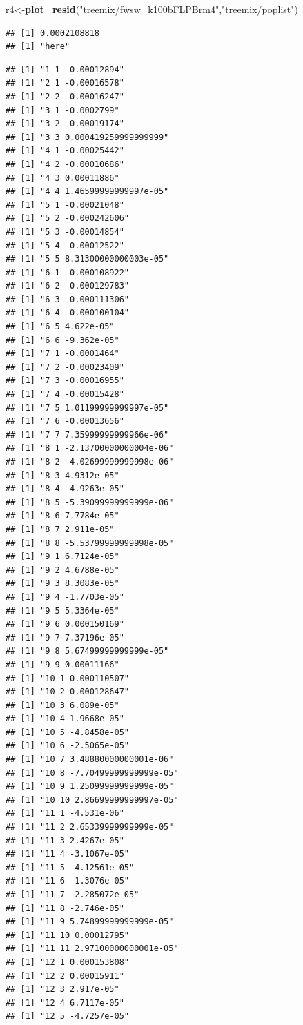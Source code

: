 \documentclass[]{article}
\newenvironment{Shaded}{\begin{snugshade}}{\end{snugshade}}
\newcommand{\KeywordTok}[1]{\textcolor[rgb]{0.13,0.29,0.53}{\textbf{#1}}}
\newcommand{\StringTok}[1]{\textcolor[rgb]{0.31,0.60,0.02}{#1}}
\newcommand{\NormalTok}[1]{#1}
\begin{document}
\begin{Shaded}
\begin{Highlighting}[]
\NormalTok{r4<-}\KeywordTok{plot_resid}\NormalTok{(}\StringTok{"treemix/fwsw_k100bFLPBrm4"}\NormalTok{,}\StringTok{"treemix/poplist"}\NormalTok{)}
\end{Highlighting}
\end{Shaded}

\begin{verbatim}
## [1] 0.0002108818
## [1] "here"
\end{verbatim}

\begin{verbatim}
## [1] "1 1 -0.00012894"
## [1] "2 1 -0.00016578"
## [1] "2 2 -0.00016247"
## [1] "3 1 -0.0002799"
## [1] "3 2 -0.00019174"
## [1] "3 3 0.000419259999999999"
## [1] "4 1 -0.00025442"
## [1] "4 2 -0.00010686"
## [1] "4 3 0.00011886"
## [1] "4 4 1.46599999999997e-05"
## [1] "5 1 -0.00021048"
## [1] "5 2 -0.000242606"
## [1] "5 3 -0.00014854"
## [1] "5 4 -0.00012522"
## [1] "5 5 8.31300000000003e-05"
## [1] "6 1 -0.000108922"
## [1] "6 2 -0.000129783"
## [1] "6 3 -0.000111306"
## [1] "6 4 -0.000100104"
## [1] "6 5 4.622e-05"
## [1] "6 6 -9.362e-05"
## [1] "7 1 -0.0001464"
## [1] "7 2 -0.00023409"
## [1] "7 3 -0.00016955"
## [1] "7 4 -0.00015428"
## [1] "7 5 1.01199999999997e-05"
## [1] "7 6 -0.00013656"
## [1] "7 7 7.35999999999966e-06"
## [1] "8 1 -2.13700000000004e-06"
## [1] "8 2 -4.02699999999998e-06"
## [1] "8 3 4.9312e-05"
## [1] "8 4 -4.9263e-05"
## [1] "8 5 -5.39099999999999e-06"
## [1] "8 6 7.7784e-05"
## [1] "8 7 2.911e-05"
## [1] "8 8 -5.53799999999998e-05"
## [1] "9 1 6.7124e-05"
## [1] "9 2 4.6788e-05"
## [1] "9 3 8.3083e-05"
## [1] "9 4 -1.7703e-05"
## [1] "9 5 5.3364e-05"
## [1] "9 6 0.000150169"
## [1] "9 7 7.37196e-05"
## [1] "9 8 5.67499999999999e-05"
## [1] "9 9 0.00011166"
## [1] "10 1 0.000110507"
## [1] "10 2 0.000128647"
## [1] "10 3 6.089e-05"
## [1] "10 4 1.9668e-05"
## [1] "10 5 -4.8458e-05"
## [1] "10 6 -2.5065e-05"
## [1] "10 7 3.48880000000001e-06"
## [1] "10 8 -7.70499999999999e-05"
## [1] "10 9 1.25099999999999e-05"
## [1] "10 10 2.86699999999997e-05"
## [1] "11 1 -4.531e-06"
## [1] "11 2 2.65339999999999e-05"
## [1] "11 3 2.4267e-05"
## [1] "11 4 -3.1067e-05"
## [1] "11 5 -4.12561e-05"
## [1] "11 6 -1.3076e-05"
## [1] "11 7 -2.285072e-05"
## [1] "11 8 -2.746e-05"
## [1] "11 9 5.74899999999999e-05"
## [1] "11 10 0.00012795"
## [1] "11 11 2.97100000000001e-05"
## [1] "12 1 0.000153808"
## [1] "12 2 0.00015911"
## [1] "12 3 2.917e-05"
## [1] "12 4 6.7117e-05"
## [1] "12 5 -4.7257e-05"

\end{verbatim}
\end{document}
